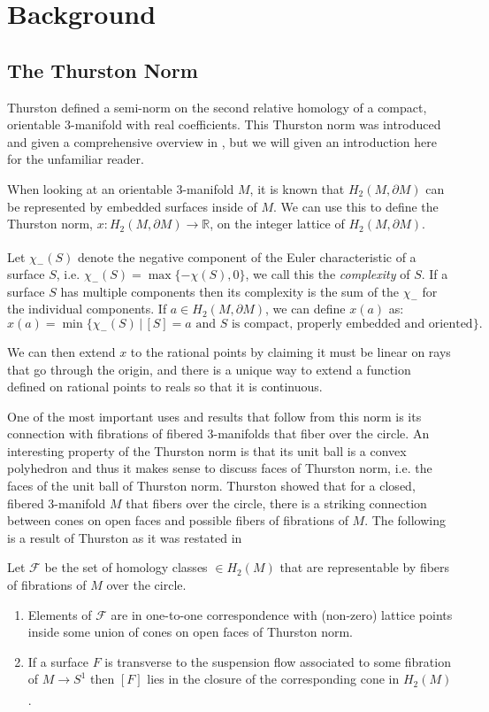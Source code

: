 \section{Background}

\subsection{The Thurston Norm}

Thurston defined a semi-norm on the second relative homology of a compact, orientable 3-manifold with real coefficients. This Thurston norm was introduced and given a comprehensive overview in \cite{thurston1986norm}, but we will given an introduction here for the unfamiliar reader.

When looking at an orientable 3-manifold $M$, it is known that $H_2(M,\partial M)$ can be represented by embedded surfaces inside of $M$. We can use this to define the Thurston norm, $x: H_2(M,\partial M) \xrightarrow[]{} \mathbb{R}$, on the integer lattice of $H_2(M,\partial M)$. 

Let $\chi_-(S)$ denote the negative component of the Euler characteristic of a surface $S$, i.e. $\chi_-(S) = \max\{-\chi(S),0\}$, we call this the \textit{complexity} of $S$. If a surface $S$ has multiple components then its complexity is the sum of the $\chi_-$ for the individual components. If $a \in H_2(M,\partial M)$, we can define $x(a)$ as:
$$x(a) = \min\{\chi_-(S) \,\vert\, [S] = a \text{ and $S$ is compact, properly embedded and oriented}\}.$$

We can then extend $x$ to the rational points by claiming it must be linear on rays that go through the origin, and there is a unique way to extend a function defined on rational points to reals so that it is continuous.

One of the most important uses and results that follow from this norm is its connection with fibrations of fibered 3-manifolds that fiber over the circle. An interesting property of the Thurston norm is that its unit ball is a convex polyhedron and thus it makes sense to discuss faces of Thurston norm, i.e. the faces of the unit ball of Thurston norm. Thurston showed that for a closed, fibered 3-manifold $M$ that fibers over the circle, there is a striking connection between cones on open faces and possible fibers of fibrations of $M$. The following is a result of Thurston as it was restated in \cite{yazdi2018pseudo}

\begin{thm}[Thurston]
Let $\mathcal{F}$ be the set of homology classes $\in H_2(M)$ that are representable by fibers of fibrations of $M$ over the circle.
\begin{enumerate}
    \item Elements of $\mathcal{F}$ are in one-to-one correspondence with (non-zero) lattice points inside some union of cones on open faces of Thurston norm.
    \item If a surface $F$ is transverse to the suspension flow associated to some fibration of $M \xrightarrow[]{} S^1$ then $[F]$ lies in the closure of the corresponding cone in $H_2(M)$.
\end{enumerate}
\end{thm}

